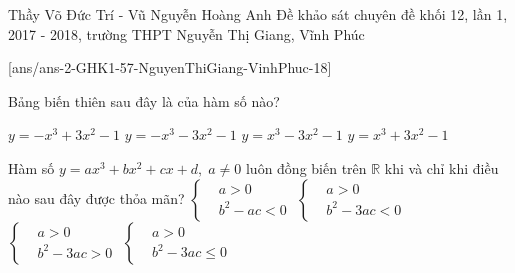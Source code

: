 \begin{name}
{Thầy Võ Đức Trí - Vũ Nguyễn Hoàng Anh}
{Đề khảo sát chuyên đề khối 12, lần 1, 2017 - 2018, trường THPT Nguyễn Thị Giang, Vĩnh Phúc}
\end{name}
\setcounter{ex}{0}
[ans/ans-2-GHK1-57-NguyenThiGiang-VinhPhuc-18]

\begin{ex}%
Bảng biến thiên sau đây là của hàm số nào?
\begin{center}
\end{center}
\choice
{\True $y=-x^3+3x^2-1$}
{$y=-x^3-3x^2-1$}
{$y=x^3-3x^2-1$}
{$y=x^3+3x^2-1$}
\end{ex}

\begin{ex}%
Hàm số $y=ax^3+bx^2+cx+d, \; a\ne 0$ luôn đồng biến trên $\mathbb{R}$ khi và chỉ khi điều nào sau đây được thỏa mãn? 
\choice
{$\left\{\begin{aligned} &a>0 \\ &b^2-ac< 0\end{aligned} \right.$}
{$\left\{\begin{aligned} &a>0 \\ &b^2-3ac< 0\end{aligned} \right.$}
{$\left\{\begin{aligned} &a>0 \\ &b^2-3ac> 0\end{aligned} \right.$}
{\True $\left\{\begin{aligned} &a>0 \\ &b^2-3ac\le 0\end{aligned} \right.$}
\end{ex}

